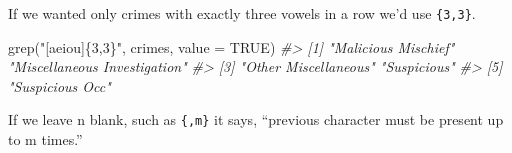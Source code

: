 \documentclass[
  12pt,
]{book}
\newenvironment{Shaded}{\begin{snugshade}}{\end{snugshade}}
\newcommand{\AttributeTok}[1]{\textcolor[rgb]{0.61,0.61,0.61}{#1}}
\newcommand{\CommentTok}[1]{\textcolor[rgb]{0.37,0.37,0.37}{\textit{#1}}}
\newcommand{\ConstantTok}[1]{\textcolor[rgb]{0,0,0}{#1}}
\newcommand{\FunctionTok}[1]{\textcolor[rgb]{0,0,0}{#1}}
\newcommand{\NormalTok}[1]{#1}
\newcommand{\StringTok}[1]{\textcolor[rgb]{0.5,0.5,0.5}{#1}}
\begin{document}
If we wanted only crimes with exactly three vowels in a row we'd use \texttt{\{3,3\}}.

\begin{Shaded}
\begin{Highlighting}[]
\FunctionTok{grep}\NormalTok{(}\StringTok{"[aeiou]\{3,3\}"}\NormalTok{, crimes, }\AttributeTok{value =} \ConstantTok{TRUE}\NormalTok{)}
\CommentTok{\#\textgreater{} [1] "Malicious Mischief"          "Miscellaneous Investigation"}
\CommentTok{\#\textgreater{} [3] "Other Miscellaneous"         "Suspicious"                 }
\CommentTok{\#\textgreater{} [5] "Suspicious Occ"}
\end{Highlighting}
\end{Shaded}

If we leave n blank, such as \texttt{\{,m\}} it says, ``previous character must be present up to m times.''
\end{document}
